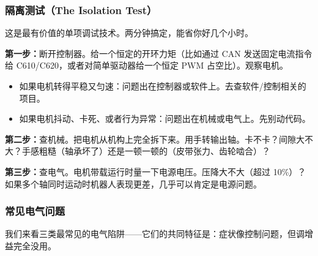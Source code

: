 \subsubsection{隔离测试（The Isolation Test）}

这是最有价值的单项调试技术。两分钟搞定，能省你好几个小时。

\textbf{第一步：}断开控制器。给一个恒定的开环力矩（比如通过 CAN 发送固定电流指令给 C610/C620，或者对简单驱动器给一个恒定 PWM 占空比）。观察电机。
\begin{itemize}
    \item 如果电机转得平稳又匀速：问题出在控制器或软件上。去查软件/控制相关的项目。
    \item 如果电机抖动、卡死、或者行为异常：问题出在机械或电气上。先别动代码。
\end{itemize}

\textbf{第二步：}查机械。把电机从机构上完全拆下来。用手转输出轴。卡不卡？间隙大不大？手感粗糙（轴承坏了）还是一顿一顿的（皮带张力、齿轮啮合）？

\textbf{第三步：}查电气。电机带载运行时量一下电源电压。压降大不大（超过 10\%）？如果多个轴同时运动时机器人表现更差，几乎可以肯定是电源问题。

\subsubsection{常见电气问题}

我们来看三类最常见的电气陷阱——它们的共同特征是：症状像控制问题，但调增益完全没用。

